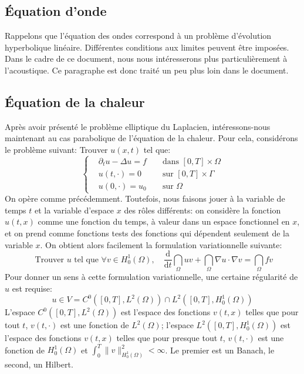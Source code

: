 \medskip
\subsection{Équation d'onde}
Rappelons que l'équation des ondes correspond à un problème d'évolution
hyperbolique linéaire.
Différentes conditions aux limites peuvent être imposées.
Dans le cadre de ce document, nous nous intéresserons plus particulièrement
à l'acoustique.
Ce paragraphe est donc traité un peu plus loin dans le document.

\medskip
\subsection{Équation de la chaleur}
Après avoir présenté le problème elliptique du Laplacien, intéressons-nous
maintenant au cas parabolique de l'équation de la chaleur.
Pour cela, considérons le problème suivant:
Trouver $u(x,t)$ tel que:
\begin{equation}
\left\{
\begin{aligned}
&\partial_t u -\Delta u = f &&\text{ dans } [0,T]\times\Omega\\
&u(t,\cdot) = 0 &&\text{ sur } [0,T]\times\Gamma\\
&u(0,\cdot)=u_0 &&\text{ sur } \Omega
\end{aligned}
\right.
\end{equation}
\medskip
On opère comme précédemment.
Toutefois, nous faisons jouer à la variable de temps $t$ et la variable d'espace $x$
des rôles différents: on considère la fonction $u(t, x)$ comme une fonction
du temps, à valeur dans un espace fonctionnel en $x$, et on prend comme fonctions
tests des fonctions qui dépendent seulement de la variable $x$.
On obtient alors facilement la formulation variationnelle suivante:
\begin{equation}
\text{ Trouver } u \text{ tel que } \forall v\in H^1_0(\Omega),\quad
\dfrac{\mathrm d}{\mathrm dt}\dint_\Omega uv+\dint_\Omega \nabla u\cdot\nabla v=\dint_\Omega fv
\end{equation}
Pour donner un sens à cette formulation variationnelle, une certaine régularité de $u$ est requise:
\begin{equation}
u\in V = C^0\left([0,T],L^2(\Omega)\right)\cap L^2\left([0,T],H^1_0(\Omega)\right)
\end{equation}
L'espace $C^0\left([0,T],L^2(\Omega)\right)$ est l'espace des fonctions $v(t,x)$ telles
que pour tout $t$, $v(t,\cdot)$ est une fonction de $L^2(\Omega)$;
l'espace $L^2\left([0,T],H^1_0(\Omega)\right)$ est l'espace des fonctions $v(t,x)$ telles
que pour presque tout $t$, $v(t,\cdot)$ est une fonction de $H^1_0(\Omega)$ et
$\int_0^T \|v\|^2_{H^1_0(\Omega)}<\infty$. Le premier est un Banach, le second, un Hilbert.

